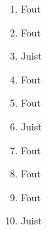 \begin{enumerate}
  \item Fout
  \item Fout
  \item Juist
  \item Fout
  \item Fout
  \item Juist
  \item Fout
  \item Fout
  \item Fout
  \item Juist
\end{enumerate}
